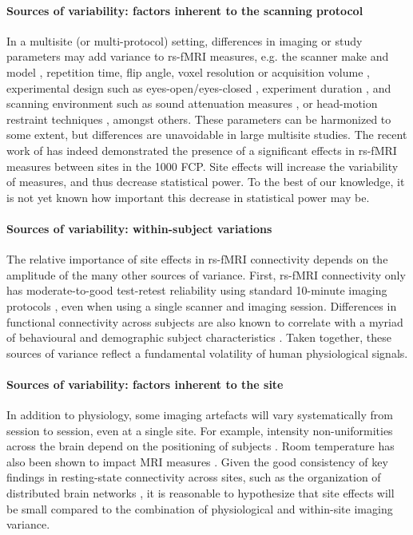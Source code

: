 \documentclass[authoryear]{elsarticle}
\begin{document}
\paragraph{Sources of variability: factors inherent to the scanning protocol}
In a multisite (or multi-protocol) setting, differences in imaging or study parameters may add variance to rs-fMRI measures, e.g. the scanner make and model \citep{Friedman2006,Friedman2008}, repetition time, flip angle, voxel resolution or acquisition volume \citep{Friedman2006a}, experimental design such as eyes-open/eyes-closed \citep{Yan2009}, experiment duration \citep{VanDijk2010}, and scanning environment such as sound attenuation measures \citep{Elliott1999}, or head-motion restraint techniques \citep{Edward2000,VanDijk2012}, amongst others. These parameters can be harmonized to some extent, but differences are unavoidable in large multisite studies. The recent work of \cite{Yan2013a} has indeed demonstrated the presence of a significant effects in rs-fMRI measures between sites in the 1000 FCP. Site effects will increase the variability of measures, and thus decrease statistical power. To the best of our knowledge, it is not yet known how important this decrease in statistical power may be. 

\paragraph{Sources of variability: within-subject variations}
The relative importance of site effects in rs-fMRI connectivity depends on the amplitude of the many other sources of variance. First, rs-fMRI connectivity only has moderate-to-good test-retest reliability using standard 10-minute imaging protocols \citep{Shehzad2009}, even when using a single scanner and imaging session. Differences in functional connectivity across subjects are also known to correlate with a myriad of behavioural and demographic subject characteristics \citep{Anand2007,Sheline2010,Kilpatrick2006}. Taken together, these sources of variance reflect a fundamental volatility of human physiological signals. 

\paragraph{Sources of variability: factors inherent to the site}
In addition to physiology, some imaging artefacts will vary systematically from session to session, even at a single site. For example, intensity non-uniformities across the brain depend on the positioning of subjects \citep{Caramanos2010}. Room temperature has also been shown to impact MRI measures \citep{Vanhoutte2006}. Given the good consistency of key findings in resting-state connectivity across sites, such as the organization of distributed brain networks \citep{Biswal2010}, it is reasonable to hypothesize that site effects will be small compared to the combination of physiological and within-site imaging variance.
\end{document}
